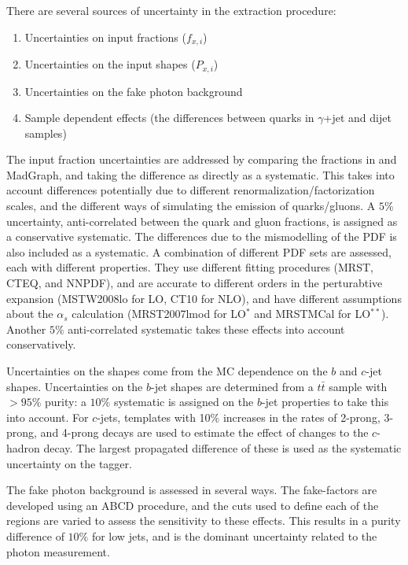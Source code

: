There are several sources of uncertainty in the extraction procedure:

\begin{enumerate}
\item Uncertainties on input fractions ($f_{x,i}$)
\item Uncertainties on the input shapes ($P_{x,i}$) 
\item Uncertainties on the fake photon background
\item Sample dependent effects (the differences between quarks in $\gamma$+jet and dijet samples)
\end{enumerate}

The input fraction uncertainties are addressed by comparing the fractions in \Pythia and MadGraph, and taking the difference as directly as a systematic. This takes into account differences potentially due to different renormalization/factorization scales, and the different ways of simulating the emission of quarks/gluons. A $5\%$ uncertainty, anti-correlated between the quark and gluon fractions, is assigned as a conservative systematic. The differences due to the mismodelling of the PDF is also included as a systematic. A combination of different PDF sets are assessed, each with different properties. They use different fitting procedures (MRST, CTEQ, and NNPDF), and are accurate to different orders in the perturabtive expansion (MSTW2008lo for LO, CT10 for NLO), and have different assumptions about the $\alpha_s$ calculation (MRST2007lmod for LO$^*$ and MRSTMCal for LO$^{**}$). Another $5\%$ anti-correlated systematic takes these effects into account conservatively.

Uncertainties on the shapes come from the MC dependence on the $b$ and $c$-jet shapes. Uncertainties on the $b$-jet shapes are determined from a $t\bar{t}$ sample with $> 95\%$ purity: a $10\%$ systematic is assigned on the $b$-jet properties to take this into account. For $c$-jets, templates with 10\% increases in the rates of 2-prong, 3-prong, and 4-prong decays are used to estimate the effect of changes to the $c$-hadron decay. The largest propagated difference of these is used as the systematic uncertainty on the tagger.

The fake photon background is assessed in several ways. The fake-factors are developed using an ABCD procedure, and the cuts used to define each of the regions are varied to assess the sensitivity to these effects. This results in a purity difference of $10\%$ for low \pt jets, and is the dominant uncertainty related to the photon measurement.

